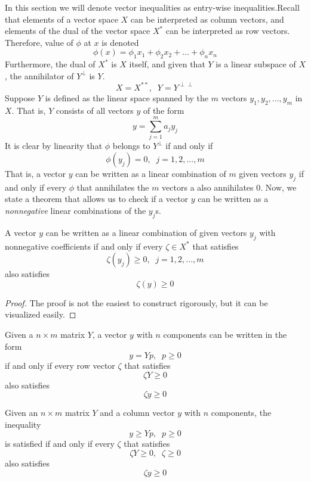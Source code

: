   In this section we will denote vector inequalities as entry-wise inequalities.Recall that elements of a vector space $X$ can be interpreted as column vectors, and elements of the dual of the vector space $X^*$ can be interpreted as row vectors. Therefore, value of $\phi$ at $x$ is denoted
  \[\phi (x) = \phi_1 x_1 + \phi_2 x_2 + ... + \phi_n x_n\]
  Furthermore, the dual of $X^*$ is $X$ itself, and given that $Y$ is a linear subspace of $X$, the annihilator of $Y^\perp$ is $Y$. 
  \[X = X^{**}, \;\; Y = Y^{\perp\perp}\]
  Suppose $Y$ is defined as the linear space spanned by the $m$ vectors $y_1, y_2, ..., y_m$ in $X$. That is, $Y$ consists of all vectors $y$ of the form
  \[y = \sum_{j=1}^m a_j y_j\]
  It is clear by linearity that $\phi$ belongs to $Y^\perp$ if and only if
  \[\phi (y_j) = 0, \;\; j = 1, 2, ..., m\]
  That is, a vector $y$ can be written as a linear combination of $m$ given vectors $y_j$ if and only if every $\phi$ that annihilates the $m$ vectors a also annihilates $0$. Now, we state a theorem that allows us to check if a vector $y$ can be written as a \textit{nonnegative} linear combinations of the $y_j$s. 

  \begin{theorem}
  A vector $y$ can be written as a linear combination of given vectors $y_j$ with nonnegative coefficients if and only if every $\zeta \in X^*$ that satisfies 
  \[ \zeta (y_j) \geq 0, \;\; j = 1, 2, ..., m\]
  also satisfies 
  \[\zeta (y) \geq 0\]
  \end{theorem}
  \begin{proof}
  The proof is not the easiest to construct rigorously, but it can be visualized easily. 
  \end{proof}

  \begin{corollary}
  Given a $n \times m$ matrix $Y$, a vector $y$ with $n$ components can be written in the form 
  \[y = Y p, \;\; p \geq 0\]
  if and only if every row vector $\zeta$ that satisfies 
  \[\zeta Y \geq 0\]
  also satisfies 
  \[\zeta y \geq 0\]
  \end{corollary}

  \begin{theorem}
  Given an $n \times m$ matrix $Y$ and a column vector $y$ with $n$ components, the inequality 
  \[y \geq Y p, \;\; p \geq 0\]
  is satisfied if and only if every $\zeta$ that satisfies
  \[\zeta Y \geq 0, \;\; \zeta \geq 0\]
  also satisfies 
  \[\zeta y \geq 0\]
  \end{theorem}

